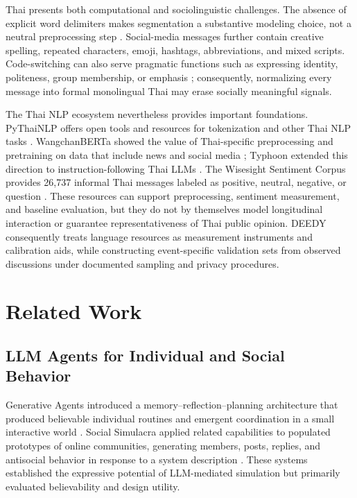 \documentclass[10pt,twocolumn]{article}
\begin{document}
Thai presents both computational and sociolinguistic challenges. The absence
of explicit word delimiters makes segmentation a substantive modeling choice,
not a neutral preprocessing step \citep{chormai2020segmentation}. Social-media
messages further contain creative spelling, repeated characters, emoji,
hashtags, abbreviations, and mixed scripts. Code-switching can also serve
pragmatic functions such as expressing identity, politeness, group membership,
or emphasis \citep{kongkerd2016codeswitching}; consequently, normalizing every
message into formal monolingual Thai may erase socially meaningful signals.

The Thai NLP ecosystem nevertheless provides important foundations.
PyThaiNLP offers open tools and resources for tokenization and other Thai NLP
tasks \citep{phatthiyaphaibun2023pythainlp}. WangchanBERTa showed the value of
Thai-specific preprocessing and pretraining on data that include news and
social media \citep{lowphansirikul2021wangchanberta}; Typhoon extended this
direction to instruction-following Thai LLMs
\citep{pipatanakul2023typhoon}. The Wisesight Sentiment Corpus provides
26,737 informal Thai messages labeled as positive, neutral, negative, or
question \citep{wisesight2020}. These resources can support preprocessing,
sentiment measurement, and baseline evaluation, but they do not by themselves
model longitudinal interaction or guarantee representativeness of Thai public
opinion. DEEDY consequently treats language resources as measurement
instruments and calibration aids, while constructing event-specific validation
sets from observed discussions under documented sampling and privacy
procedures.

\section{Related Work}
\label{sec:related}

\subsection{LLM Agents for Individual and Social Behavior}

Generative Agents introduced a memory--reflection--planning architecture that
produced believable individual routines and emergent coordination in a small
interactive world \citep{park2023generative}. Social Simulacra applied related
capabilities to populated prototypes of online communities, generating
members, posts, replies, and antisocial behavior in response to a system
description \citep{park2022social}. These systems established the expressive
potential of LLM-mediated simulation but primarily evaluated believability and
design utility.
\end{document}
